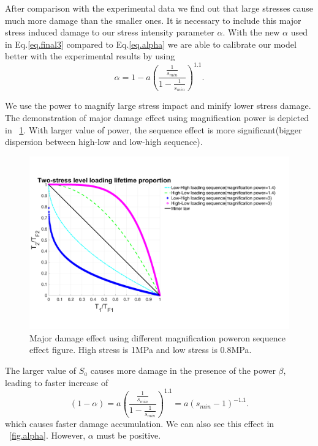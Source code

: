 \documentclass[3p,times,number,review]{elsarticle}
\newcommand{\figref}[1]{\figurename~\ref{#1}}
\begin{document}
After comparison with the experimental data we find out that large stresses cause much more damage than the smaller ones. It is necessary to include this major stress induced damage to our stress intensity parameter $\alpha$. With the new $\alpha$ used in Eq.\eqref{eq.final3} compared to Eq.\eqref{eq.alpha} we are able to calibrate our model better with the experimental results by using 
\begin{equation}
\alpha=1-a\left(  \dfrac{\frac{1}{s_{min}}}{1-\frac{1}{s_{min}}} \right) ^{1.1}.
\label{eq.majoralp}
\end{equation}


We use the power to magnify large stress impact and minify lower stress damage.  The demonstration of major damage effect using magnification power is depicted in \figref{fig.sequenceours}. With larger value of power, the sequence effect is more significant(bigger dispersion between high-low and low-high sequence).

\begin{figure}[!h]
\centering
\includegraphics[width=\textwidth]{figures//sequence_ours.png} 
\caption{Major damage effect using different magnification poweron sequence effect figure. High stress is 1MPa and low stress is 0.8MPa.}
\label{fig.sequenceours}
\end{figure}

The larger value of $S_{a}$ causes more damage in the presence of the power $\beta$, leading to faster increase of 
$$(1-\alpha)=a\left(  \dfrac{\frac{1}{s_{min}}}{1-\frac{1}{s_{min}}} \right) ^1.1=a(s_{min}-1)^{-1.1}.$$ 
which causes faster damage accumulation. We can also see this effect in \figref{fig.alpha}. However, $\alpha$ must be positive. 
\end{document}
